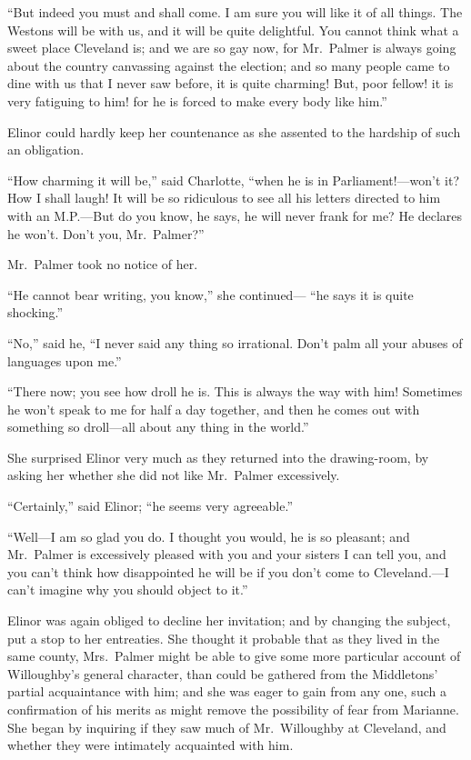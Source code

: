 \documentclass{article}
\begin{document}
``But indeed you must and shall come.  I am sure you
will like it of all things.  The Westons will be with us,
and it will be quite delightful.  You cannot think
what a sweet place Cleveland is; and we are so gay now,
for Mr.\ Palmer is always going about the country canvassing
against the election; and so many people came to dine
with us that I never saw before, it is quite charming!  But,
poor fellow! it is very fatiguing to him! for he is forced
to make every body like him.''

Elinor could hardly keep her countenance as she
assented to the hardship of such an obligation.

``How charming it will be,'' said Charlotte, ``when he
is in Parliament!---won't it? How I shall laugh!  It will
be so ridiculous to see all his letters directed to him
with an M.P.---But do you know, he says, he will never frank
for me?  He declares he won't.  Don't you, Mr.\ Palmer?''

Mr.\ Palmer took no notice of her.

``He cannot bear writing, you know,'' she continued---%
``he says it is quite shocking.''

``No,'' said he, ``I never said any thing so irrational.
Don't palm all your abuses of languages upon me.''

``There now; you see how droll he is.  This is always
the way with him!  Sometimes he won't speak to me for half
a day together, and then he comes out with something
so droll---all about any thing in the world.''

She surprised Elinor very much as they returned
into the drawing-room, by asking her whether she did
not like Mr.\ Palmer excessively.

``Certainly,'' said Elinor; ``he seems very agreeable.''

``Well---I am so glad you do.  I thought you would,
he is so pleasant; and Mr.\ Palmer is excessively pleased
with you and your sisters I can tell you, and you can't
think how disappointed he will be if you don't come
to Cleveland.---I can't imagine why you should object
to it.''

Elinor was again obliged to decline her invitation;
and by changing the subject, put a stop to her entreaties.
She thought it probable that as they lived in the
same county, Mrs.\ Palmer might be able to give some
more particular account of Willoughby's general
character, than could be gathered from the Middletons'
partial acquaintance with him; and she was eager to gain
from any one, such a confirmation of his merits as might
remove the possibility of fear from Marianne.  She began
by inquiring if they saw much of Mr.\ Willoughby at Cleveland,
and whether they were intimately acquainted with him.
\end{document}
